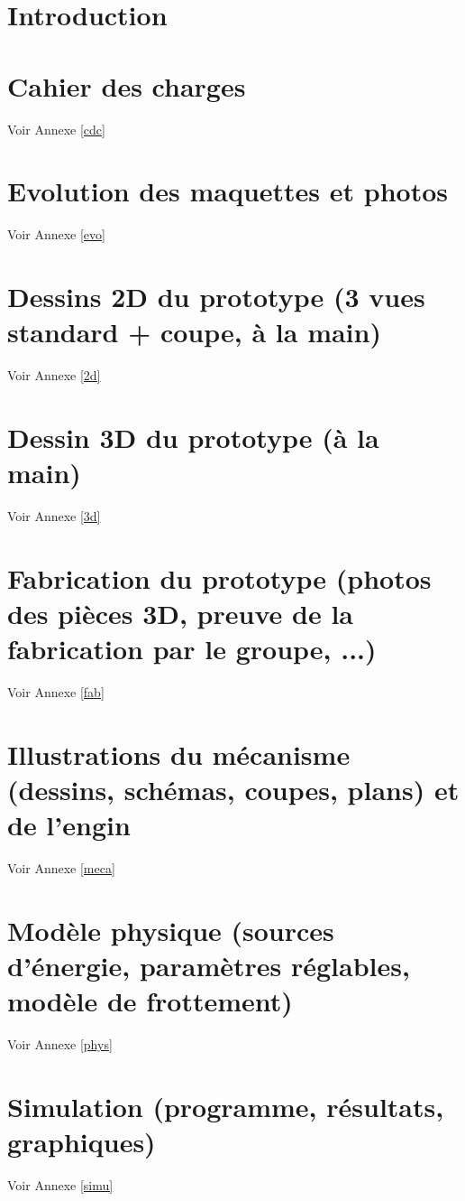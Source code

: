 \documentclass{report}
\begin{document}
\tableofcontents

\chapter*{Introduction}


\chapter{Cahier des charges}
Voir Annexe \ref{cdc}

\chapter{Evolution des maquettes et photos}
Voir Annexe \ref{evo}

\chapter{Dessins 2D du prototype (3 vues standard + coupe, à la main)}
Voir Annexe \ref{2d}

\chapter{Dessin 3D du prototype (à la main)}
Voir Annexe \ref{3d}

\chapter{Fabrication du prototype (photos des pièces 3D, preuve de la fabrication par le groupe, ...)} 
Voir Annexe \ref{fab}

\chapter{Illustrations du mécanisme (dessins, schémas, coupes, plans) et de l’engin}
Voir Annexe \ref{meca}

\chapter{Modèle physique (sources d’énergie, paramètres réglables, modèle de frottement)} 
Voir Annexe \ref{phys}

\chapter{Simulation (programme, résultats, graphiques)}
Voir Annexe \ref{simu}
\end{document}
